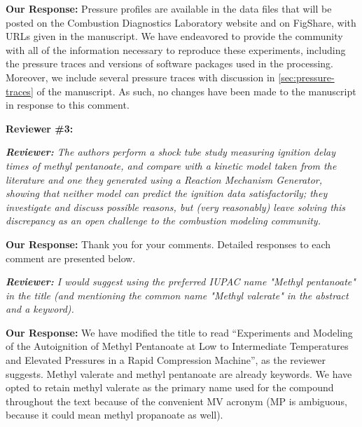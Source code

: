 \documentclass{article}
\newenvironment{reviewer}{\vspace{0.5\baselineskip}\begingroup\itshape\textbf{Reviewer:}}{\endgroup\vspace{0.5\baselineskip}}
\newenvironment{response}{\vspace{0.5\baselineskip}\textbf{Our Response:}}{\vspace{0.5\baselineskip}}
\begin{document}
\begin{response}
    Pressure profiles are available in the data files that will be posted on the Combustion
    Diagnostics Laboratory website and on FigShare, with URLs given in the manuscript. We have
    endeavored to provide the community with all of the information necessary to reproduce these
    experiments, including the pressure traces and versions of software packages used in the
    processing. Moreover, we include several pressure traces with discussion in
    \cref{sec:pressure-traces} of the manuscript. As such, no changes have been made to the
    manuscript in response to this comment.
\end{response}

\noindent\textbf{Reviewer \#3:}

\begin{reviewer}
    The authors perform a shock tube study measuring ignition delay times of methyl pentanoate, and
    compare with a kinetic model taken from the literature and one they generated using a Reaction
    Mechanism Generator, showing that neither model can predict the ignition data satisfactorily;
    they investigate and discuss possible reasons, but (very reasonably) leave solving this
    discrepancy as an open challenge to the combustion modeling community.
\end{reviewer}

\begin{response}
    Thank you for your comments. Detailed responses to each comment are presented below.
\end{response}

\begin{reviewer}
    I would suggest using the preferred IUPAC name "Methyl pentanoate" in the title (and mentioning
    the common name "Methyl valerate" in the abstract and a keyword).
\end{reviewer}

\begin{response}
    We have modified the title to read ``Experiments and Modeling of the Autoignition of Methyl
    Pentanoate at Low to Intermediate Temperatures and Elevated Pressures in a Rapid Compression
    Machine'', as the reviewer suggests. Methyl valerate and methyl pentanoate are already keywords.
    We have opted to retain methyl valerate as the primary name used for the compound throughout the
    text because of the convenient MV acronym (MP is ambiguous, because it could mean methyl
    propanoate as well).
\end{response}
\end{document}
